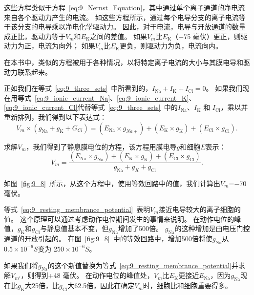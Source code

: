 \begin{proposition}[利用等效回路模型计算静息膜电位]
	\quad \quad 这些方程类似于方程~\ref{eq:9_Nernst_Equation}，其中通过单个离子通道的净电流来自各个驱动力产生的电流。
	如这些方程所示，通过每个电导分支的离子电流等于该分支的电导乘以净电化学驱动力。
	因此，对于电流，电导与开放通道的数量成正比，驱动力等于$V_m$和$E_\text{K}$之间的差值。
	如果$V_m$比$E_\text{K}$（−75 毫伏）更正，则驱动力为正，电流为向外；
	如果$V_m$比$E_\text{K}$更负，则驱动力为负，电流向内。
	
	\quad \quad 在本书中，类似的方程被用于各种情况，以将特定离子电流的大小与其膜电导和驱动力联系起来。
	
	\quad \quad 正如我们在等式~\ref{eq:9_three_sets}~中所看到的，$ I_\text{Na} + I_\text{K} + I_\text{Cl} = 0 $。
	如果我们现在用等式~\ref{eq:9_ionic_current_Na}、\ref{eq:9_ionic_current_K}、\ref{eq:9_ionic_current_Cl}代替等式~\ref{eq:9_three_sets}~中的$ I_\text{Na} $、$ I_\text{K} $ 和 $ I_\text{Cl} $，乘以并重新排列，我们得到以下表达式：
	\begin{equation}\label{eq:9_rearrange_three}
		V_m \times (g_\text{Na} + g_\text{K} + G_{Cl}) = 
		(E_\text{Na} \times g_{Na+}) + (E_\text{K} \times g_\text{K}) + (E_\text{Cl} \times g_\text{Cl}).
	\end{equation}
	
	\quad \quad 求解$V_m$，我们得到了静息膜电位的方程，该方程用膜电导$ g $和细胞$ E $表示：
	\begin{equation}\label{eq:9_resting_membrance_potential}
		V_m = 
		\frac{
			(E_\text{Na} \times g_\text{Na}) + 
			(E_\text{K} \times g_\text{K}) + 
			(E_\text{Cl} \times g_\text{Cl})
		}
		{
			g_\text{Na} + g_{K} + g_\text{Cl}
		}.
	\end{equation}
	
	\quad \quad 如图~\ref{fig:9_8}~所示，从这个方程中，使用等效回路中的值，我们计算出$V_m$=−70 毫伏。
	
	\quad \quad 等式~\ref{eq:9_resting_membrance_potential}~表明$V_m$接近电导较大的离子细胞的值。
	这个原理可以通过考虑动作电位期间发生的事情来说明。
	在动作电位的峰值，$ g_\text{K} $和$ g_\text{Cl} $与静息值基本不变，但$ g_\text{Na} $增加了500倍。
	$ g_\text{Na} $的这种增加是由电压门控通道的开放引起的。
	在图~\ref{fig:9_8}~中的等效回路中，增加500倍将使$ g_\text{Na} $从 $ 0.5\times 10^{-6} S$变为 $ 250 \times 10^{-6} S $。
	
	\quad \quad 如果我们将$ g_\text{Na} $的这个新值替换为等式~\ref{eq:9_resting_membrance_potential}并求解$V_{m'}$，则得到+48 毫伏。
	在动作电位的峰值处，$V_m$比$E_\text{K}$更接近$ E_\text{Na} $，因为$ g_\text{Na} $现在比$ g_\text{K} $大25倍，比$ g_\text{Cl} $大62.5倍，因此在确定$V_m$时，细胞比和细胞重要得多。
	

\end{proposition}
